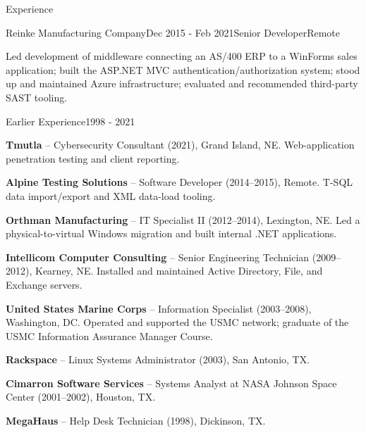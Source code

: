 \documentclass{resume} %
\begin{document}
\begin{rSection}{Experience}
\begin{rSubsection}{Reinke Manufacturing Company}{Dec 2015 - Feb 2021}{Senior Developer}{Remote}
\item Led development of middleware connecting an AS/400 ERP to a WinForms sales application; built the ASP.NET MVC authentication/authorization system; stood up and maintained Azure infrastructure; evaluated and recommended third-party SAST tooling.
\end{rSubsection}

\begin{rSubsection}{Earlier Experience}{1998 - 2021}{}{}
\item {\bf Tmutla} -- Cybersecurity Consultant (2021), Grand Island, NE. Web-application penetration testing and client reporting.
\item {\bf Alpine Testing Solutions} -- Software Developer (2014--2015), Remote. T-SQL data import/export and XML data-load tooling.
\item {\bf Orthman Manufacturing} -- IT Specialist II (2012--2014), Lexington, NE. Led a physical-to-virtual Windows migration and built internal .NET applications.
\item {\bf Intellicom Computer Consulting} -- Senior Engineering Technician (2009--2012), Kearney, NE. Installed and maintained Active Directory, File, and Exchange servers.
\item {\bf United States Marine Corps} -- Information Specialist (2003--2008), Washington, DC. Operated and supported the USMC network; graduate of the USMC Information Assurance Manager Course.
\item {\bf Rackspace} -- Linux Systems Administrator (2003), San Antonio, TX.
\item {\bf Cimarron Software Services} -- Systems Analyst at NASA Johnson Space Center (2001--2002), Houston, TX.
\item {\bf MegaHaus} -- Help Desk Technician (1998), Dickinson, TX.
\end{rSubsection}

\end{rSection}

\end{document}
